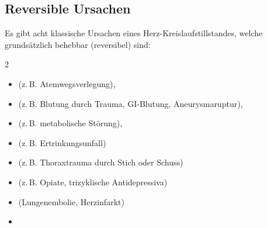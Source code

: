 \documentclass[
ngerman,
paper=a4,
asymmetric,
fontsize=8pt,
draft=false,
numbers=noenddot,
bibtotocnumbered,
footnotes=multiple,
toc=flat,
]{scrbook}
\begin{document}



\subsection{Reversible Ursachen}

Es gibt acht klassische Ursachen eines
Herz-Kreislaufstillstandes, welche grundsätzlich behebbar
(reversibel) sind:

\begin{multicols}{2}
\TableBaseModification
\begin{itemize}
  \item {}

  (z.\,B. Atemwegsverlegung),
  \item {}

  (z.\,B. Blutung durch Trauma,   GI-Blutung, Aneurysmaruptur),
  \item {}

  (z.\,B. metabolische Störung),
  \item {}

  (z.\,B. Ertrinkungsunfall)
  \item {}

  (z.\,B. Thoraxtrauma durch Stich oder Schuss)
  \item {}

  (z.\,B. Opiate, trizyklische Antidepressiva)
  \item {}

  (Lungenembolie, Herzinfarkt)
  \item {}
\end{itemize}
\end{multicols}


\noindent {} 
\end{document}
